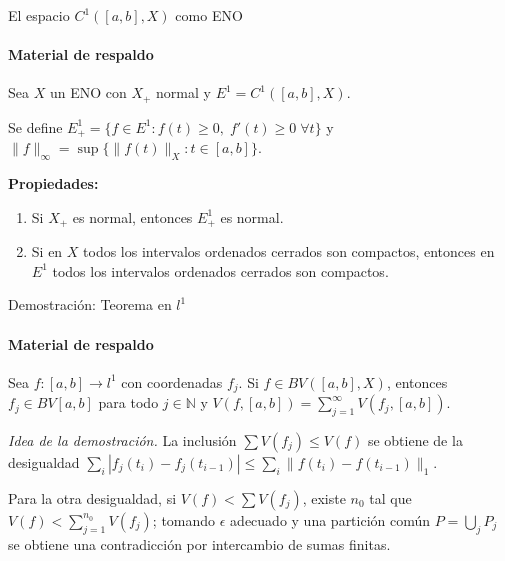\documentclass{beamer}
\newcommand{\Xp}{X_{+}}               %
\newcommand{\BVX}{BV([a,b],X)}        %
\begin{document}

\begin{frame}[noframenumbering]{El espacio $C^1([a,b],X)$ como ENO}
\framesubtitle{Material de respaldo}

Sea $X$ un ENO con $\Xp$ normal y $E^1=C^1([a,b],X)$.

Se define $E_+^1=\{f\in E^1:f(t)\ge 0,\;f'(t)\ge 0\;\forall t\}$
y $\|f\|_\infty=\sup\{\|f(t)\|_X:t\in[a,b]\}$.

\medskip

\textbf{Propiedades:}
\begin{enumerate}
    \item Si $\Xp$ es normal, entonces $E_+^1$ es normal.
    \item Si en $X$ todos los intervalos ordenados cerrados son compactos,
          entonces en $E^1$ todos los intervalos ordenados cerrados son
          compactos.
\end{enumerate}
\end{frame}


\begin{frame}[noframenumbering]{Demostración: Teorema en $l^1$}
\framesubtitle{Material de respaldo}

\begin{theorem}
Sea $f:[a,b]\to l^1$ con coordenadas $f_j$. Si $f\in\BVX$, entonces
$f_j\in BV[a,b]$ para todo $j\in\mathbb{N}$ y
$V(f,[a,b])=\sum_{j=1}^\infty V(f_j,[a,b])$.
\end{theorem}

\textit{Idea de la demostración.}
La inclusión $\sum V(f_j)\le V(f)$ se obtiene de la desigualdad
$\sum_i|f_j(t_i)-f_j(t_{i-1})|\le\sum_i\|f(t_i)-f(t_{i-1})\|_1$.

Para la otra desigualdad, si $V(f)<\sum V(f_j)$, existe $n_0$ tal que
$V(f)<\sum_{j=1}^{n_0}V(f_j)$; tomando $\epsilon$ adecuado y una
partición común $P=\bigcup_j P_j$ se obtiene una contradicción por
intercambio de sumas finitas.
\end{frame}

\end{document}
